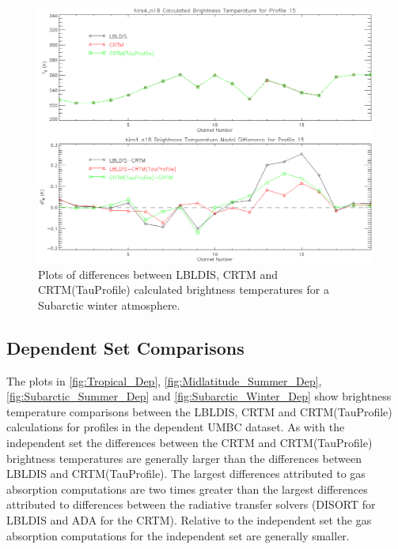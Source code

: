 \begin{figure}[htp]
  \centering{}
  \includegraphics[scale=0.8]{./graphics/Clear_Sky_Comparison_15.eps}
  \caption{Plots of differences between LBLDIS, CRTM and CRTM(TauProfile) calculated brightness temperatures for
   a Subarctic winter atmosphere.}
  \label{fig:Clear_Sky_Subarctic_winter}
\end{figure}

\subsection{Dependent Set Comparisons}

The plots in \ref{fig:Tropical_Dep}, \ref{fig:Midlatitude_Summer_Dep}, \ref{fig:Subarctic_Summer_Dep} and \ref{fig:Subarctic_Winter_Dep} show brightness temperature comparisons between the LBLDIS, CRTM and CRTM(TauProfile) calculations for profiles in the dependent UMBC dataset. As with the independent set the differences
between the CRTM and CRTM(TauProfile) brightness temperatures are generally larger than the differences between LBLDIS and CRTM(TauProfile). The largest differences
attributed to gas absorption computations are two times greater than the largest differences attributed to differences between the radiative transfer solvers (DISORT for LBLDIS and ADA for the CRTM). Relative to the independent set the gas absorption computations for the independent set are generally smaller. 

